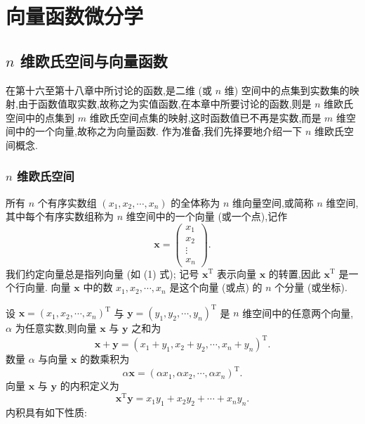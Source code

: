 \chapter{向量函数微分学}

\section{\(n\) 维欧氏空间与向量函数}

在第十六至第十八章中所讨论的函数,是二维 (或 \(n\) 维) 空间中的点集到实数集的映射,由于函数值取实数,故称之为实值函数,在本章中所要讨论的函数,则是 \(n\) 维欧氏空间中的点集到 \(m\) 维欧氏空间点集的映射,这时函数值已不再是实数,而是 \(m\) 维空间中的一个向量,故称之为向量函数. 作为准备,我们先择要地介绍一下 \(n\) 维欧氏空间概念.

\subsection{ \(n\) 维欧氏空间}

所有 \(n\) 个有序实数组 \(\left( {{x}_{1},{x}_{2},\cdots ,{x}_{n}}\right)\) 的全体称为 \(n\) 维向量空间,或简称 \(n\) 维空间, 其中每个有序实数组称为 \(n\) 维空间中的一个向量 (或一个点),记作
\[
\mathbf{x} = \left( \begin{matrix} {x}_{1} \\  {x}_{2} \\  \vdots \\  {x}_{n} \end{matrix}\right) . \tag{1}
\]
我们约定向量总是指列向量 (如 (1) 式); 记号 \({\mathbf{x}}^{\mathrm{T}}\) 表示向量 \(\mathbf{x}\) 的转置,因此 \({\mathbf{x}}^{\mathrm{T}}\) 是一个行向量. 向量 \(\mathbf{x}\) 中的数 \({x}_{1},{x}_{2},\cdots ,{x}_{n}\) 是这个向量 (或点) 的 \(n\) 个分量 (或坐标).

设 \(\mathbf{x} = {\left( {x}_{1},{x}_{2},\cdots ,{x}_{n}\right) }^{\mathrm{T}}\) 与 \(\mathbf{y} = {\left( {y}_{1},{y}_{2},\cdots ,{y}_{n}\right) }^{\mathrm{T}}\) 是 \(n\) 维空间中的任意两个向量, \(\alpha\) 为任意实数,则向量 \(\mathbf{x}\) 与 \(\mathbf{y}\) 之和为
\[
\mathbf{x} + \mathbf{y} = {\left( {x}_{1} + {y}_{1},{x}_{2} + {y}_{2},\cdots ,{x}_{n} + {y}_{n}\right) }^{\mathrm{T}}.
\]
数量 \(\alpha\) 与向量 \(\mathbf{x}\) 的数乘积为
\[
\alpha \mathbf{x} = {\left( \alpha {x}_{1},\alpha {x}_{2},\cdots ,\alpha {x}_{n}\right) }^{\mathrm{T}}.
\]
向量 \(\mathbf{x}\) 与 \(\mathbf{y}\) 的内积定义为
\[
{\mathbf{x}}^{\mathrm{T}}\mathbf{y} = {x}_{1}{y}_{1} + {x}_{2}{y}_{2} + \cdots  + {x}_{n}{y}_{n}.
\]
内积具有如下性质:

